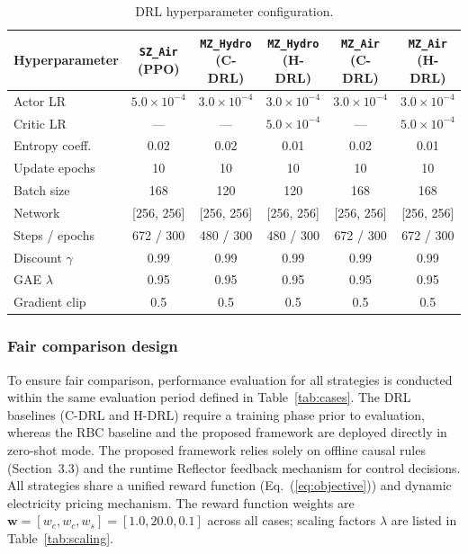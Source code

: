 \documentclass[a4paper]{cas-sc}
\begin{document}
\begin{table}[htbp]
    \centering
    \caption{DRL hyperparameter configuration.}
    \label{tab:hyperparams}
    \renewcommand{\arraystretch}{1.3}
    \setlength{\tabcolsep}{4pt}
    \footnotesize
    \begin{tabular}{l c c c c c}
        \toprule
        \textbf{Hyperparameter} & \makecell{\texttt{SZ\_Air}\\(PPO)} & \makecell{\texttt{MZ\_Hydro}\\(C-DRL)} & \makecell{\texttt{MZ\_Hydro}\\(H-DRL)} & \makecell{\texttt{MZ\_Air}\\(C-DRL)} & \makecell{\texttt{MZ\_Air}\\(H-DRL)} \\
        \midrule
        Actor LR          & $5.0\!\times\!10^{-4}$ & $3.0\!\times\!10^{-4}$ & $3.0\!\times\!10^{-4}$ & $3.0\!\times\!10^{-4}$ & $3.0\!\times\!10^{-4}$ \\
        Critic LR         & ---                     & ---                     & $5.0\!\times\!10^{-4}$ & ---                     & $5.0\!\times\!10^{-4}$ \\
        Entropy coeff.    & 0.02 & 0.02 & 0.01 & 0.02 & 0.01 \\
        Update epochs     & 10   & 10   & 10   & 10   & 10 \\
        Batch size        & 168  & 120  & 120  & 168  & 168 \\
        Network           & [256, 256] & [256, 256] & [256, 256] & [256, 256] & [256, 256] \\
        Steps / epochs    & 672 / 300  & 480 / 300  & 480 / 300  & 672 / 300  & 672 / 300 \\
        Discount $\gamma$ & 0.99 & 0.99 & 0.99 & 0.99 & 0.99 \\
        GAE $\lambda$     & 0.95 & 0.95 & 0.95 & 0.95 & 0.95 \\
        Gradient clip     & 0.5  & 0.5  & 0.5  & 0.5  & 0.5 \\
        \bottomrule
    \end{tabular}
\end{table}

\subsubsection{Fair comparison design}

To ensure fair comparison, performance evaluation for all strategies is conducted within the same evaluation period defined in Table~\ref{tab:cases}. The DRL baselines (C-DRL and H-DRL) require a training phase prior to evaluation, whereas the RBC baseline and the proposed framework are deployed directly in zero-shot mode. The proposed framework relies solely on offline causal rules (Section~3.3) and the runtime Reflector feedback mechanism for control decisions. All strategies share a unified reward function (Eq.~(\ref{eq:objective})) and dynamic electricity pricing mechanism. The reward function weights are $\mathbf{w} = [w_e, w_c, w_s] = [1.0, 20.0, 0.1]$ across all cases; scaling factors $\lambda$ are listed in Table~\ref{tab:scaling}.
\end{document}
